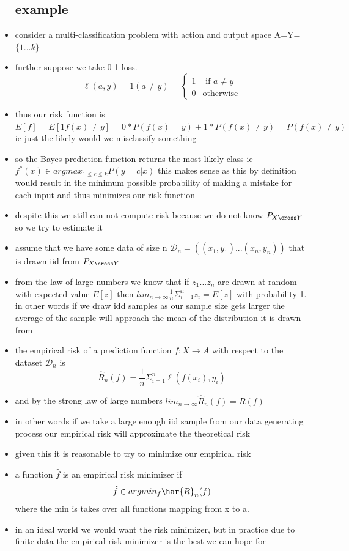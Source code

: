 \documentclass{article}
\begin{document}
\begin{itemize}
\subsection{example}
\item consider a multi-classification problem with action and output space A=Y=$\{1...k\}$
\item further suppose we take 0-1 loss. 
\begin{equation*}
\ell(a,y) = 1(a\neq y) = \left\{
        \begin{array}{ll}
            1 & \text{ if } a\neq y  \\
            0 & \text{otherwise}
        \end{array}
    \right.
\end{equation*}
\item thus our risk function is $E[f]=E[1f(x)\neq y]=0*P(f(x)=y)+1*P(f(x)\neq y)=P(f(x)\neq y)$ ie just the likely would we misclassify something 
\item so the Bayes prediction function returns the most likely class ie $f^{*}(x)\in argmax_{1\leq c\leq k}P(y=c|x)$ this makes sense as this by definition would result in the minimum possible probability of making a mistake for each input and thus minimizes our risk function
\item despite this we still can not compute risk because we do not know $P_{X\cross Y}$ so we try to estimate it 
\item assume that we have some data of size n $\mathcal{D}_{n}=((x_1,y_1)...(x_n,y_n))$ that is drawn iid from $P_{X\cross Y}$
\item from the law of large numbers we know that if $z_1...z_n$ are drawn at random with expected value $E[z]$ then $lim_{n\rightarrow \infty}\frac{1}{n}\Sigma_{i=1}^{n}z_i=E[z]$ with probability 1. in other words if we draw idd samples  as our sample size gets larger the average of the sample will approach the mean of the distribution it is drawn from 
\item the empirical risk of a prediction function $f:X\rightarrow A$ with respect to the dataset $\mathcal{D}_{n}$ is $$\hat{R}_{n}(f)=\frac{1}{n}\Sigma_{i=1}^{n}\ell(f(x_i),y_i)$$
\item and by the strong law of large numbers $lim_{n\rightarrow \infty}\hat{R}_{n}(f)=R(f)$ 
\item in other words if we take a large enough iid sample from our data generating process our empirical risk will approximate the theoretical risk 
\item given this it is reasonable to try to minimize our empirical risk 
\item a function $\hat{f}$ is an empirical risk minimizer if $$\hat{f}\in argmin_{f}\har{R}_{n}(f)$$  where the min is takes over all functions mapping from x to a.
\item in an ideal world we would want the risk minimizer, but in practice due to finite data the empirical risk minimizer is the best we can hope for 

\end{itemize}
\end{document}
